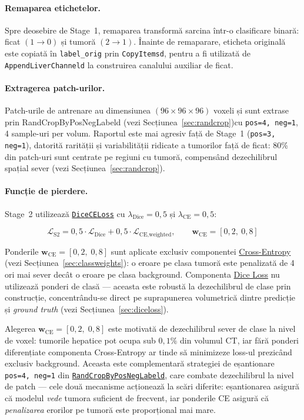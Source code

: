 \documentclass[12pt, a4paper]{report}
\begin{document}
\paragraph{Remaparea etichetelor.}
Spre deosebire de Stage~1, remaparea transformă sarcina într-o
clasificare binară: ficat $(1 \to 0)$ și tumoră $(2 \to 1)$.
Înainte de remaparare, eticheta originală este copiată în
\texttt{label\_orig} prin \texttt{CopyItemsd}, pentru a fi
utilizată de \texttt{AppendLiverChanneld} la construirea
canalului auxiliar de ficat.

\paragraph{Extragerea patch-urilor.}
Patch-urile de antrenare au dimensiunea $(96 \times 96 \times 96)$
voxeli și sunt extrase prin
RandCropByPosNegLabeld (vezi Secțiunea~\ref{sec:randcrop})cu
\texttt{pos=4, neg=1}, 4 sample-uri per volum.
Raportul este mai agresiv față de Stage~1 (\texttt{pos=3, neg=1}),
datorită rarității și variabilității ridicate a tumorilor față de
ficat: 80\% din patch-uri sunt centrate pe regiuni cu tumoră,
compensând dezechilibrul spațial sever
(vezi Secțiunea~\ref{sec:randcrop}).

\paragraph{Funcție de pierdere.}
Stage~2 utilizează \hyperref[sec:diceceloss]{\texttt{DiceCELoss}}
cu $\lambda_{\text{Dice}} = 0{,}5$ și $\lambda_{\text{CE}} = 0{,}5$:

\begin{equation}
    \mathcal{L}_{\text{S2}}
    = 0{,}5 \cdot \mathcal{L}_{\text{Dice}}
    + 0{,}5 \cdot \mathcal{L}_{\text{CE,weighted}},
    \qquad \mathbf{w}_{\text{CE}} = [0{,}2,\ 0{,}8]
\end{equation}

Ponderile $\mathbf{w}_{\text{CE}} = [0{,}2,\; 0{,}8]$ sunt aplicate
exclusiv componentei \hyperref[sec:celoss]{Cross-Entropy}
(vezi Secțiunea~\ref{sec:classweights}): o eroare pe clasa tumoră
este penalizată de 4 ori mai sever decât o eroare pe clasa background.
Componenta \hyperref[sec:diceloss]{Dice Loss} nu utilizează ponderi
de clasă — aceasta este robustă la dezechilibrul de clase prin
construcție, concentrându-se direct pe suprapunerea volumetrică
dintre predicție și \textit{ground truth}
(vezi Secțiunea~\ref{sec:diceloss}).

Alegerea $\mathbf{w}_{\text{CE}} = [0{,}2,\; 0{,}8]$ este motivată
de dezechilibrul sever de clase la nivel de voxel: tumorile hepatice
pot ocupa sub $0{,}1\%$ din volumul CT, iar fără ponderi diferențiate
componenta Cross-Entropy ar tinde să minimizeze loss-ul prezicând
exclusiv background. Aceasta este complementară strategiei de
eșantionare \texttt{pos=4, neg=1} din
\hyperref[sec:randcrop]{\texttt{RandCropByPosNegLabeld}}, care
combate dezechilibrul la nivel de patch — cele două mecanisme
acționează la scări diferite: eșantionarea asigură că modelul
\textit{vede} tumora suficient de frecvent, iar ponderile CE
asigură că \textit{penalizarea} erorilor pe tumoră este
proporțional mai mare.
\end{document}
